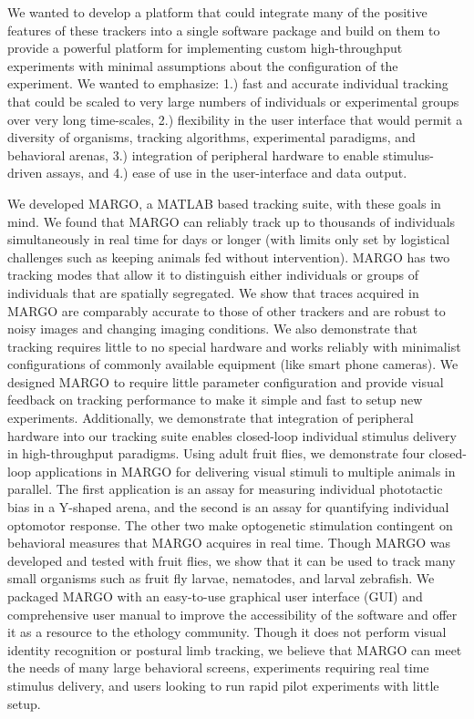 \documentclass[10pt]{article}
\begin{document}
\begin{multicols}{2}
We wanted to develop a platform that could integrate many of the positive features of these trackers into a single software package and build on them to provide a powerful platform for implementing custom high-throughput experiments with minimal assumptions about the configuration of the experiment. We wanted to emphasize: 1.) fast and accurate individual tracking that could be scaled to very large numbers of individuals or experimental groups over very long time-scales, 2.) flexibility in the user interface that would permit a diversity of organisms, tracking algorithms, experimental paradigms, and behavioral arenas, 3.) integration of peripheral hardware to enable stimulus-driven assays, and  4.) ease of use in the user-interface and data output. 

We developed MARGO, a MATLAB based tracking suite, with these goals in mind. We found that MARGO can reliably track up to thousands of individuals simultaneously in real time for days or longer (with limits only set by logistical challenges such as keeping animals fed without intervention). MARGO has two tracking modes that allow it to distinguish either individuals or groups of individuals that are spatially segregated. We show that traces acquired in MARGO are comparably accurate to those of other trackers and are robust to noisy images and changing imaging conditions. We also demonstrate that tracking requires little to no special hardware and works reliably with minimalist configurations of commonly available equipment (like smart phone cameras). We designed MARGO to require little parameter configuration and provide visual feedback on tracking performance to make it simple and fast to setup new experiments. Additionally, we demonstrate that integration of peripheral hardware into our tracking suite enables closed-loop individual stimulus delivery in high-throughput paradigms. Using adult fruit flies, we demonstrate four closed-loop\cite{heisenberg_wolf_1984} applications in MARGO for delivering visual stimuli to multiple animals in parallel. The first application is an assay for measuring individual phototactic bias in a Y-shaped arena, and the second is an assay for quantifying individual optomotor response. The other two make optogenetic stimulation contingent on behavioral measures that MARGO acquires in real time. Though MARGO was developed and tested with fruit flies, we show that it can be used to track many small organisms such as fruit fly larvae, nematodes, and larval zebrafish. We packaged MARGO with an easy-to-use graphical user interface (GUI) and comprehensive user manual to improve the accessibility of the software and offer it as a resource to the ethology community. Though it does not perform visual identity recognition or postural limb tracking, we believe that MARGO can meet the needs of many large behavioral screens, experiments requiring real time stimulus delivery, and users looking to run rapid pilot experiments with little setup.


\end{multicols}
\end{document}
